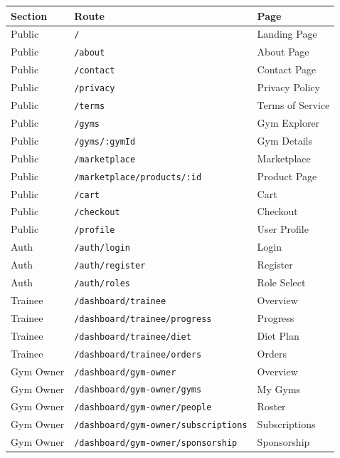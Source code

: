 \documentclass[a4paper,11pt]{article}
\begin{document}
{\footnotesize
\begin{center}
\begin{tabular}{|l|l|l|}
\hline
\textbf{Section} & \textbf{Route} & \textbf{Page} \\ \hline\hline
Public & \texttt{/} & Landing Page \\ \hline
Public & \texttt{/about} & About Page \\ \hline
Public & \texttt{/contact} & Contact Page \\ \hline
Public & \texttt{/privacy} & Privacy Policy \\ \hline
Public & \texttt{/terms} & Terms of Service \\ \hline
Public & \texttt{/gyms} & Gym Explorer \\ \hline
Public & \texttt{/gyms/:gymId} & Gym Details \\ \hline
Public & \texttt{/marketplace} & Marketplace \\ \hline
Public & \texttt{/marketplace/products/:id} & Product Page \\ \hline
Public & \texttt{/cart} & Cart \\ \hline
Public & \texttt{/checkout} & Checkout \\ \hline
Public & \texttt{/profile} & User Profile \\ \hline\hline
Auth & \texttt{/auth/login} & Login \\ \hline
Auth & \texttt{/auth/register} & Register \\ \hline
Auth & \texttt{/auth/roles} & Role Select \\ \hline\hline
Trainee & \texttt{/dashboard/trainee} & Overview \\ \hline
Trainee & \texttt{/dashboard/trainee/progress} & Progress \\ \hline
Trainee & \texttt{/dashboard/trainee/diet} & Diet Plan \\ \hline
Trainee & \texttt{/dashboard/trainee/orders} & Orders \\ \hline\hline
Gym Owner & \texttt{/dashboard/gym-owner} & Overview \\ \hline
Gym Owner & \texttt{/dashboard/gym-owner/gyms} & My Gyms \\ \hline
Gym Owner & \texttt{/dashboard/gym-owner/people} & Roster \\ \hline
Gym Owner & \texttt{/dashboard/gym-owner/subscriptions} & Subscriptions \\ \hline
Gym Owner & \texttt{/dashboard/gym-owner/sponsorship} & Sponsorship \\ \hline

\end{tabular}
\end{center}}
\end{document}
